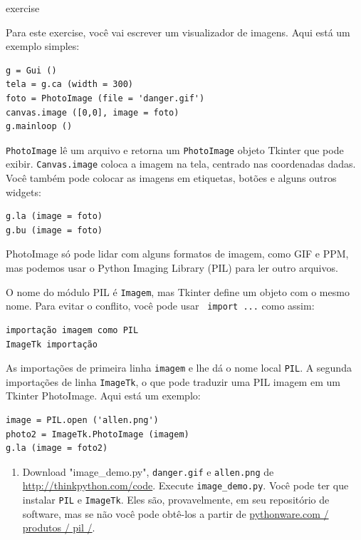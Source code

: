 \documentclass[10pt]{book}
\begin{document}
\begin{exercise}
\begin{v erbatim}
\begin{} exercise

Para este exercise, você vai escrever um visualizador de imagens. Aqui está
um exemplo simples:

\begin{verbatim}
g = Gui ()
tela = g.ca (width = 300)
foto = PhotoImage (file = 'danger.gif')
canvas.image ([0,0], image = foto)
g.mainloop ()
\end{verbatim}
%
{\tt PhotoImage} lê um arquivo e retorna um {\tt PhotoImage} objeto
Tkinter que pode exibir. {\tt Canvas.image} coloca a imagem na
tela, centrado nas coordenadas dadas. Você também pode colocar as imagens em
etiquetas, botões e alguns outros widgets:

\begin{verbatim}
g.la (image = foto)
g.bu (image = foto)
\end{verbatim}
%
PhotoImage só pode lidar com alguns formatos de imagem, como GIF e PPM, 
mas podemos usar o Python Imaging Library (PIL) para ler outro
arquivos.

O nome do módulo PIL é {\tt Imagem}, mas Tkinter define um
objeto com o mesmo nome. Para evitar o conflito, você pode usar {\tt
  import ...} como assim:

\begin{verbatim}
importação imagem como PIL
ImageTk importação
\end{verbatim}
%
As importações de primeira linha {\tt imagem} e
lhe dá o nome local {\tt PIL}. A segunda
importações de linha {\tt ImageTk}, o que pode traduzir uma PIL
imagem em um Tkinter PhotoImage. Aqui está um exemplo:

\begin{verbatim}
image = PIL.open ('allen.png')
photo2 = ImageTk.PhotoImage (imagem)
g.la (image = foto2)
\end{verbatim}
%

\begin{enumerate}

\item Download \verbo "image_demo.py", \verb "danger.gif" e \verb "allen.png"
de \url{http://thinkpython.com/code}. Execute \verb "image_demo.py". Você
pode ter que instalar {\tt PIL} e {\tt ImageTk}.  
Eles são, provavelmente, em seu repositório de software, mas se não
você pode obtê-los a partir de \url{pythonware.com / produtos / pil /}.


\end{enumerate}
\end{}
\end{v erbatim}
\end{exercise}
\end{document}
